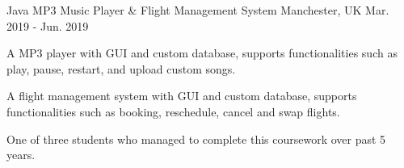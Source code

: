 \begin{cventries}
\cventry
  {Java} %
  {MP3 Music Player \& Flight Management System} %
  {Manchester, UK} %
  {Mar. 2019 - Jun. 2019} %
  {
    \begin{cvitems} %
      \item {A MP3 player with GUI and custom database, supports functionalities such as play, pause, restart, and upload custom songs.}
      \item {A flight management system with GUI and custom database, supports functionalities such as booking, reschedule, cancel and swap flights.}
      \item {One of three students who managed to complete this coursework over past 5 years.}
    \end{cvitems}
  }


  

\end{cventries}
